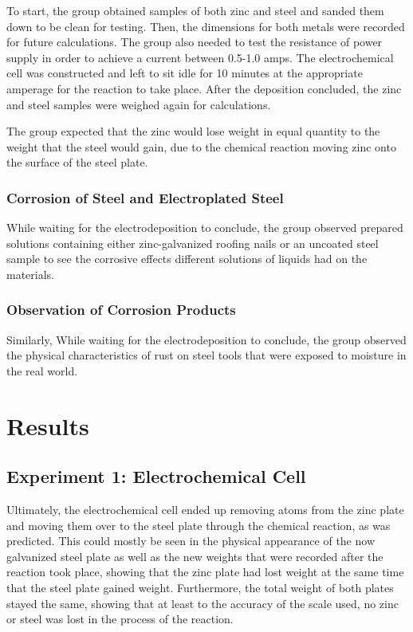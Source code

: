 \documentclass{article}
\begin{document}
To start, the group obtained samples of both zinc and steel and sanded them down to be clean for testing. Then, the dimensions for both metals were recorded for future calculations. The group also needed to test the resistance of power supply in order to achieve a current between 0.5-1.0 amps. The electrochemical cell was constructed and left to sit idle for 10 minutes at the appropriate amperage for the reaction to take place. After the deposition concluded, the zinc and steel samples were weighed again for calculations.

The group expected that the zinc would lose weight in equal quantity to the weight that the steel would gain, due to the chemical reaction moving zinc onto the surface of the steel plate. 

\subsubsection{Corrosion of Steel and Electroplated Steel}
While waiting for the electrodeposition to conclude, the group observed prepared solutions containing either zinc-galvanized roofing nails or an uncoated steel sample to see the corrosive effects different solutions of liquids had on the materials.

\subsubsection{Observation of Corrosion Products}
Similarly, While waiting for the electrodeposition to conclude, the group observed the physical characteristics of rust on steel tools that were exposed to moisture in the real world.

\section{Results}
\subsection{Experiment 1: Electrochemical Cell}
Ultimately, the electrochemical cell ended up removing atoms from the zinc plate and moving them over to the steel plate through the chemical reaction, as was predicted. This could mostly be seen in the physical appearance of the now galvanized steel plate as well as the new weights that were recorded after the reaction took place, showing that the zinc plate had lost weight at the same time that the steel plate gained weight. Furthermore, the total weight of both plates stayed the same, showing that at least to the accuracy of the scale used, no zinc or steel was lost in the process of the reaction. 
\end{document}
